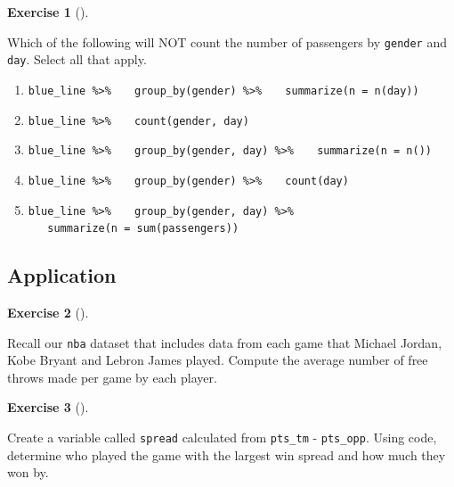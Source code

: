 \documentclass[
  letterpaper,
  DIV=11,
  numbers=noendperiod]{scrreprt}
\theoremstyle{definition}
\newtheorem{exercise}{Exercise}[chapter]
\theoremstyle{remark}
\begin{document}
\leavevmode{}%
\begin{exercise}[]\label{exr-ch03-c11}

Which of the following will NOT count the number of passengers by
\texttt{gender} and \texttt{day}. Select all that apply.

\begin{enumerate}
\def\labelenumi{\alph{enumi})}
\item
  \texttt{blue\_line\ \%\textgreater{}\%}
  \texttt{~~~group\_by(gender)\ \%\textgreater{}\%}
  \texttt{~~~summarize(n\ =\ n(day))}
\item
  \texttt{blue\_line\ \%\textgreater{}\%}
  \texttt{~~~count(gender,\ day)}
\item
  \texttt{blue\_line\ \%\textgreater{}\%}
  \texttt{~~~group\_by(gender,\ day)\ \%\textgreater{}\%}
  \texttt{~~~summarize(n\ =\ n())}
\item
  \texttt{blue\_line\ \%\textgreater{}\%}
  \texttt{~~~group\_by(gender)\ \%\textgreater{}\%}
  \texttt{~~~count(day)}
\item
  \texttt{blue\_line\ \%\textgreater{}\%}
  \texttt{~~~group\_by(gender,\ day)\ \%\textgreater{}\%}
  \texttt{~~~summarize(n\ =\ sum(passengers))}
\end{enumerate}

\end{exercise}

\hypertarget{sec-ex03-application}{%
\subsection{Application}\label{sec-ex03-application}}

\leavevmode{}%
\begin{exercise}[]\label{exr-ch03-app1}

Recall our \texttt{nba} dataset that includes data from each game that
Michael Jordan, Kobe Bryant and Lebron James played. Compute the average
number of free throws made per game by each player.

\end{exercise}

\leavevmode{}%
\begin{exercise}[]\label{exr-ch03-app2}

Create a variable called \texttt{spread} calculated from
\texttt{pts\_tm} - \texttt{pts\_opp}. Using code, determine who played
the game with the largest win spread and how much they won by.

\end{exercise}
\end{document}
